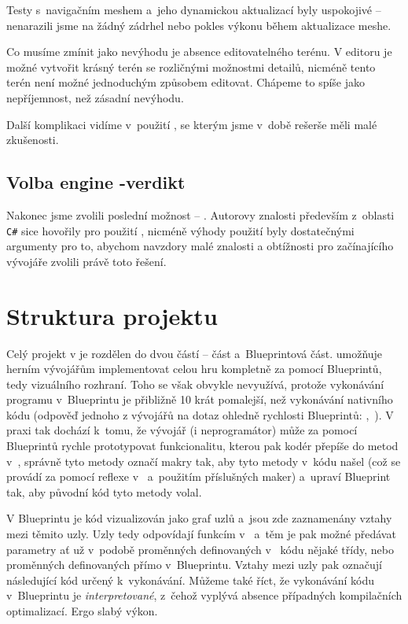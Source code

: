 Testy s~navigačním meshem a~jeho dynamickou aktualizací byly uspokojivé -- nenarazili jsme na žádný zádrhel nebo pokles výkonu během aktualizace meshe. 

Co musíme zmínit jako nevýhodu je absence editovatelného terénu. V editoru je možné vytvořit krásný terén se rozličnými možnostmi detailů, nicméně tento terén není možné jednoduchým způsobem editovat. Chápeme to spíše jako nepříjemnost, než zásadní nevýhodu. 

Další komplikaci vidíme v~použití \CPP{}, se kterým jsme v~době rešerše měli malé zkušenosti.




\subsection{Volba engine -verdikt}


Nakonec jsme zvolili poslední možnost -- \UE{}. Autorovy znalosti především z~oblasti \texttt{C\#} sice hovořily pro použití \UN{}, nicméně výhody použití \UE{} byly dostatečnými argumenty pro to, abychom navzdory malé znalosti \CPP{} a obtížnosti pro začínajícího vývojáře zvolili právě toto řešení.

\section{Struktura projektu}

Celý projekt v \UE{} je rozdělen do dvou částí -- \CPP{} část a~Blueprintová část. \UE{} umožňuje herním vývojářům implementovat celou hru kompletně za pomocí Blueprintů, tedy vizuálního rozhraní. Toho se však obvykle nevyužívá, protože vykonávání programu v~Blueprintu je přibližně 10 krát pomalejší, než vykonávání nativního \CPP{} kódu (odpověď jednoho z vývojářů \UE{} na dotaz ohledně rychlosti Blueprintů: ,~\citep{ue_performance}). V praxi tak dochází k~tomu, že vývojář (i neprogramátor) může za pomocí Blueprintů rychle prototypovat funkcionalitu, kterou pak kodér přepíše do metod v~\CPP{}, správně tyto metody označí makry tak, aby \UE{} tyto metody v~kódu našel (což se provádí za pomocí reflexe v~\UBT{} a~použitím příslušných \CPP{} maker) a~upraví Blueprint tak, aby původní kód tyto metody volal.

 V Blueprintu je kód vizualizován jako graf uzlů a~jsou zde zaznamenány vztahy mezi těmito uzly. Uzly tedy odpovídají funkcím v~\CPP{} a~těm je pak možné předávat parametry ať už v~podobě proměnných definovaných v~\CPP{} kódu nějaké třídy, nebo proměnných definovaných přímo v~Blueprintu. Vztahy mezi uzly pak označují následující kód určený k~vykonávání. Můžeme také říct, že vykonávání kódu v~Blueprintu je \textit{interpretované}, z~čehož vyplývá absence případných kompilačních optimalizací. Ergo slabý výkon. 

